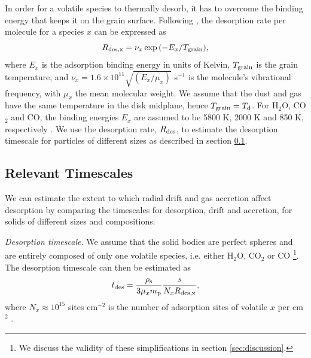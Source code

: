 \documentclass[apj]{emulateapj}
\newcommand{\emgr}[1]{\emph{ \color{gray} #1}}
\begin{document}
In order for a volatile species to thermally desorb, it has to overcome the binding energy that keeps it on the grain surface. Following \citet{hollenbach09}, the desorption rate per molecule for a species $x$ can be expressed as
\begin{equation}
\label{eq:Rdes}
R_{\rm{des}, x} = \nu_x \exp{(-E_x/T_{\rm grain})},
\end{equation}
where $E_x$ is the adsorption binding energy in units of Kelvin, $T_{\rm grain}$ is the grain temperature, and $\nu_x=1.6 \times 10^{11} \sqrt{(E_x/\mu_x)}$ s$^{-1}$ is the molecule's vibrational frequency, with $\mu_x$ the mean molecular weight. We assume that the dust and gas have the same temperature in the disk midplane, hence $T_{\rm grain}=T_{\rm d}$. For H$_2$O, CO$_2$ and CO, the binding energies $E_x$ are assumed to be 5800 K, 2000 K and 850 K, respectively \citep{oberg11}. We use the desorption rate, $R_{\rm des}$, to estimate the desorption timescale for particles of different sizes as described in section \ref{sec:timescales}. 




\subsection{Relevant Timescales}
\label{sec:timescales}

We can estimate the extent to which radial drift and gas accretion affect desorption by comparing the timescales for desorption, drift and accretion, for solids of different sizes and compositions. 

\textit{Desorption timescale.} We assume that the solid bodies are perfect spheres and are entirely composed of only one volatile species, i.e. either H$_2$O, CO$_2$ or CO \footnote{We discuss the validity of these simplifications in section \ref{sec:discussion}.}. The desorption timescale can then be estimated as
\begin{equation}
\label{eq:tdes}
t_{\rm des}=\frac{\rho_{\rm s}}{3 \mu_x m_{\rm p}} \frac{s}{N_x R_{\rm des, x}},
\end{equation}
where $N_x \approx 10^{15}$ sites cm$^{-2}$ is the number of adsorption sites of volatile $x$ per cm$^2$ \citep{hollenbach09}. 
\end{document}
